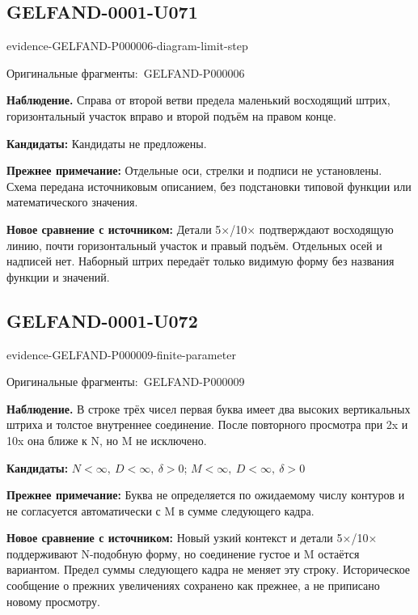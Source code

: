 \documentclass[11pt]{article}
\newcommand{\EvidenceBlock}[4]{%
 \par\smallskip\noindent\begin{minipage}{\linewidth}
 \begin{minipage}[t]{.47\linewidth}\vspace{0pt}\centering
 \csname evidence-#1-#2\endcsname\par
 {\scriptsize\SourceCropCaption\ #1}\par
 \end{minipage}\hfill
 \begin{minipage}[t]{.49\linewidth}\vspace{0pt}\raggedright
 {\small\color{orange!65!black}\textbf{#4} #3}\par
 \end{minipage}
 \end{minipage}\par\smallskip}
\newcommand{\SourceCropCaption}{Оригинальные фрагменты:}\newcommand{\ReadingCaption}{Сомнительное чтение.}\newcommand{\IncompleteCaption}{Неразобранный фрагмент.}\newcommand{\DiagramCaption}{Рисунок и набранное описание.}
\begin{document}
\subsection*{GELFAND-0001-U071}
\EvidenceBlock{GELFAND-P000006}{diagram-limit-step}{Справа от второй ветви предела маленький восходящий штрих, горизонтальный участок вправо и второй подъём на правом конце.}{Наблюдение.}
\par\smallskip\noindent\textbf{Кандидаты: } Кандидаты не предложены.\par
\par\smallskip\noindent\textbf{Прежнее примечание: } Отдельные оси, стрелки и подписи не установлены. Схема передана источниковым описанием, без подстановки типовой функции или математического значения.\par
\par\smallskip\noindent\textbf{Новое сравнение с источником: } Детали 5×/10× подтверждают восходящую линию, почти горизонтальный участок и правый подъём. Отдельных осей и надписей нет. Наборный штрих передаёт только видимую форму без названия функции и значений.\par

\subsection*{GELFAND-0001-U072}
\EvidenceBlock{GELFAND-P000009}{finite-parameter}{В строке трёх чисел первая буква имеет два высоких вертикальных штриха и толстое внутреннее соединение. После повторного просмотра при 2x и 10x она ближе к N, но M не исключено.}{Наблюдение.}
\par\smallskip\noindent\textbf{Кандидаты: } \(N<\infty,\ D<\infty,\ \delta>0\); \(M<\infty,\ D<\infty,\ \delta>0\)\par
\par\smallskip\noindent\textbf{Прежнее примечание: } Буква не определяется по ожидаемому числу контуров и не согласуется автоматически с M в сумме следующего кадра.\par
\par\smallskip\noindent\textbf{Новое сравнение с источником: } Новый узкий контекст и детали 5×/10× поддерживают N-подобную форму, но соединение густое и M остаётся вариантом. Предел суммы следующего кадра не меняет эту строку. Историческое сообщение о прежних увеличениях сохранено как прежнее, а не приписано новому просмотру.\par
\end{document}
